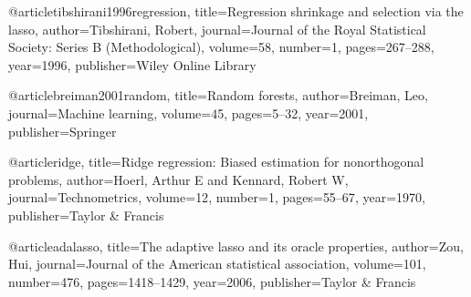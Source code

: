 
@article{tibshirani1996regression,
  title={Regression shrinkage and selection via the lasso},
  author={Tibshirani, Robert},
  journal={Journal of the Royal Statistical Society: Series B (Methodological)},
  volume={58},
  number={1},
  pages={267--288},
  year={1996},
  publisher={Wiley Online Library}
}


@article{breiman2001random,
  title={Random forests},
  author={Breiman, Leo},
  journal={Machine learning},
  volume={45},
  pages={5--32},
  year={2001},
  publisher={Springer}
}


@article{ridge,
  title={Ridge regression: Biased estimation for nonorthogonal problems},
  author={Hoerl, Arthur E and Kennard, Robert W},
  journal={Technometrics},
  volume={12},
  number={1},
  pages={55--67},
  year={1970},
  publisher={Taylor \& Francis}
}



@article{adalasso,
  title={The adaptive lasso and its oracle properties},
  author={Zou, Hui},
  journal={Journal of the American statistical association},
  volume={101},
  number={476},
  pages={1418--1429},
  year={2006},
  publisher={Taylor \& Francis}
}
